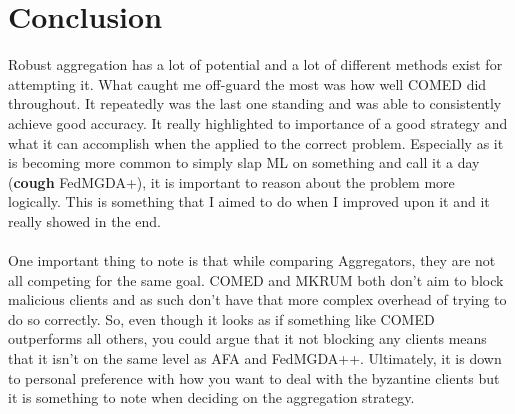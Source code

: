 \section{Conclusion}
Robust aggregation has a lot of potential and a lot of different methods exist for attempting it.
What caught me off-guard the most was how well COMED did throughout.
It repeatedly was the last one standing and was able to consistently achieve good accuracy.
It really highlighted to importance of a good strategy and what it can accomplish when the applied to the correct problem.
Especially as it is becoming more common to simply slap ML on something and call it a day (\textbf{cough} FedMGDA+), it is important to reason about the problem more logically.
This is something that I aimed to do when I improved upon it and it really showed in the end.
\\ \\
One important thing to note is that while comparing Aggregators, they are not all competing for the same goal.
COMED and MKRUM both don't aim to block malicious clients and as such don't have that more complex overhead of trying to do so correctly.
So, even though it looks as if something like COMED outperforms all others, you could argue that it not blocking any clients means that it isn't on the same level as AFA and FedMGDA++.
Ultimately, it is down to personal preference with how you want to deal with the byzantine clients but it is something to note when deciding on the aggregation strategy.